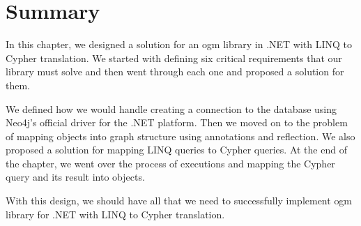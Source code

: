 \pagebreak

\section{Summary}

In this chapter, we designed a solution for an \acrshort{ogm} library in .NET with LINQ to Cypher translation.
We started with defining six critical requirements that our library must solve and then went through each one and proposed a solution for them.

We defined how we would handle creating a connection to the database using Neo4j's official driver for the .NET platform.
Then we moved on to the problem of mapping objects into graph structure using annotations and reflection.
We also proposed a solution for mapping LINQ queries to Cypher queries.
At the end of the chapter, we went over the process of executions and mapping the Cypher query and its result into objects.

With this design, we should have all that we need to successfully implement \acrshort{ogm} library for .NET with LINQ to Cypher translation.
